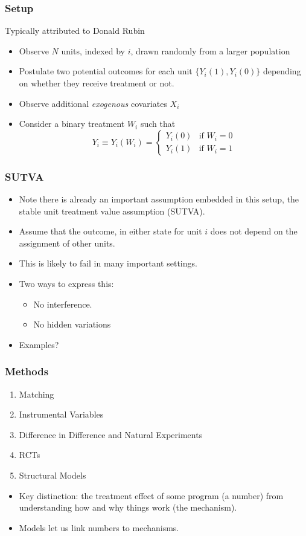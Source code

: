 \begin{frame}
  \frametitle{Setup}
  Typically attributed to Donald Rubin
  \begin{itemize}
  \item Observe $N$ units, indexed by $i$, drawn randomly from a larger population
  \item Postulate two \alert{potential outcomes} for each unit $\{Y_i(1), Y_i(0)\}$ depending on whether they receive treatment or not.
  \item Observe additional \textit{exogenous} covariates $X_i$
  \item Consider a binary treatment $W_i$ such that 
  \begin{equation*}
    Y_{i} \equiv Y_i(W_i) = 
      \begin{cases}
        Y_i(0) & \text{if $W_i=0$}\\
        Y_i(1) & \text{if $W_i=1$}
      \end{cases}       
  \end{equation*}
\end{itemize}
\end{frame}

\begin{frame}
  \frametitle{SUTVA}
  \begin{itemize}
  \item Note there is already an important assumption embedded in this setup, the stable unit treatment value assumption (\alert{SUTVA}). 
  \item Assume that the outcome, in either state for unit $i$ does not depend on the assignment of other units.   
  \item This is likely to fail in many important settings. 
  \item Two ways to express this:
  \begin{itemize}
  	\item No interference.
  	\item No hidden variations
  \end{itemize}
  \item Examples?
\end{itemize}
\end{frame}

\begin{frame}
  \frametitle{Methods}
  \begin{enumerate}
  \item Matching
  \item Instrumental Variables
  \item Difference in Difference and Natural Experiments
  \item RCTs
  \item Structural Models
  \end{enumerate}
  \begin{itemize}
  \item Key distinction: the treatment effect of some program (a number) from understanding how and why things work (the mechanism).
  \item Models let us link numbers to mechanisms.
  \end{itemize}
\end{frame}

